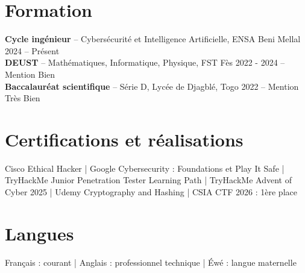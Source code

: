 \documentclass[10pt,a4paper]{article}
\newcommand{\edu}[4]{%
  \textbf{#1} -- #2 \hfill #3 #4\\[-1pt]
}
\begin{document}
\section{Formation}
\edu{Cycle ingénieur}{Cybersécurité et Intelligence Artificielle, ENSA Beni Mellal}{2024 -- Présent}{}
\edu{DEUST}{Mathématiques, Informatique, Physique, FST Fès}{2022 - 2024}{-- Mention Bien}
\edu{Baccalauréat scientifique}{Série D, Lycée de Djagblé, Togo}{2022}{-- Mention Très Bien}

\section{Certifications et réalisations}
Cisco Ethical Hacker | Google Cybersecurity : Foundations et Play It Safe | TryHackMe Junior Penetration Tester Learning Path | TryHackMe Advent of Cyber 2025 | Udemy Cryptography and Hashing | CSIA CTF 2026 : 1ère place

\section{Langues}
Français : courant | Anglais : professionnel technique | Éwé : langue maternelle
\end{document}
